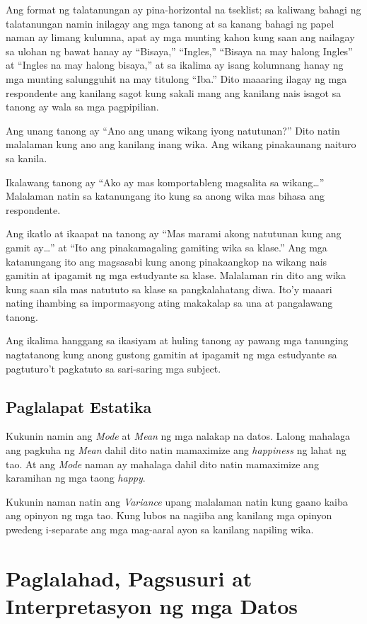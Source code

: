 \documentclass [11pt] {report}
\begin{document}
Ang format ng talatanungan ay pina-horizontal na tseklist; sa kaliwang bahagi ng
talatanungan namin inilagay ang mga tanong at sa kanang bahagi ng papel naman ay
limang kulumna, apat ay mga munting kahon kung saan ang nailagay sa ulohan ng
bawat hanay ay ``Bisaya,'' ``Ingles,'' ``Bisaya na may halong Ingles'' at
``Ingles na may halong bisaya,'' at sa ikalima ay isang kolumnang hanay ng mga
munting salungguhit na may titulong ``Iba.'' Dito maaaring ilagay ng mga
respondente ang kanilang sagot kung sakali mang ang kanilang nais isagot sa
tanong ay wala sa mga pagpipilian.

Ang unang tanong ay ``Ano ang unang wikang iyong natutunan?'' Dito natin
malalaman kung ano ang kanilang inang wika. Ang wikang pinakaunang naituro sa
kanila.
  
Ikalawang tanong ay ``Ako ay mas komportableng magsalita sa wikang\ldots''
Malalaman natin sa katanungang ito kung sa anong wika mas bihasa ang
respondente.

Ang ikatlo at ikaapat na tanong ay ``Mas marami akong natutunan kung ang gamit
ay\ldots'' at ``Ito ang pinakamagaling gamiting wika sa klase.'' Ang mga
katanungang ito ang magsasabi kung anong pinakaangkop na wikang nais gamitin at
ipagamit ng mga estudyante sa klase. Malalaman rin dito ang wika kung saan sila
mas natututo sa klase sa pangkalahatang diwa. Ito'y maaari nating ihambing sa
impormasyong ating makakalap sa una at pangalawang tanong.

Ang ikalima hanggang sa ikasiyam at huling tanong ay pawang mga tanunging
nagtatanong kung anong gustong gamitin at ipagamit ng mga estudyante sa
pagtuturo't pagkatuto sa sari-saring mga subject.
\section{Paglalapat Estatika}
Kukunin namin ang \emph{Mode} at \emph{Mean} ng mga nalakap na datos. Lalong
mahalaga ang pagkuha ng \emph{Mean} dahil dito natin mamaximize ang
\emph{happiness} ng lahat ng tao. At ang \emph{Mode} naman ay mahalaga dahil
dito natin mamaximize ang karamihan ng mga taong \emph{happy}.

Kukunin naman natin ang \emph{Variance} upang malalaman natin kung gaano kaiba
ang opinyon ng mga tao. Kung lubos na nagiiba ang kanilang mga opinyon pwedeng
i-separate ang mga mag-aaral ayon sa kanilang napiling wika.

\chapter{Paglalahad, Pagsusuri at Interpretasyon ng mga Datos}
\end{document}
